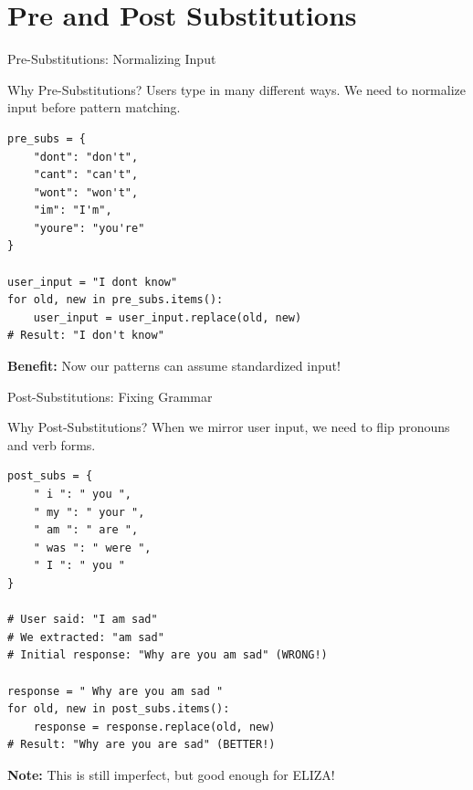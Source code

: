 \documentclass[aspectratio=169]{beamer}
\begin{document}
\section{Pre and Post Substitutions}

\begin{frame}[fragile]{Pre-Substitutions: Normalizing Input 🔄}
\begin{block}{Why Pre-Substitutions?}
Users type in many different ways. We need to normalize input before pattern matching.
\end{block}

\vspace{0.3cm}

\begin{lstlisting}
pre_subs = {
    "dont": "don't",
    "cant": "can't",
    "wont": "won't",
    "im": "I'm",
    "youre": "you're"
}

user_input = "I dont know"
for old, new in pre_subs.items():
    user_input = user_input.replace(old, new)
# Result: "I don't know"
\end{lstlisting}

\vspace{0.3cm}

\textbf{Benefit:} Now our patterns can assume standardized input!
\end{frame}

\begin{frame}[fragile]{Post-Substitutions: Fixing Grammar 🔄}
\begin{block}{Why Post-Substitutions?}
When we mirror user input, we need to flip pronouns and verb forms.
\end{block}

\vspace{0.3cm}

\begin{lstlisting}
post_subs = {
    " i ": " you ",
    " my ": " your ",
    " am ": " are ",
    " was ": " were ",
    " I ": " you "
}

# User said: "I am sad"
# We extracted: "am sad"
# Initial response: "Why are you am sad" (WRONG!)

response = " Why are you am sad "
for old, new in post_subs.items():
    response = response.replace(old, new)
# Result: "Why are you are sad" (BETTER!)
\end{lstlisting}

\vspace{0.3cm}

\textbf{Note:} This is still imperfect, but good enough for ELIZA!
\end{frame}
\end{document}
